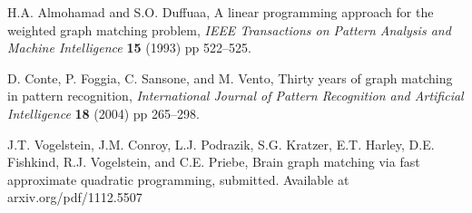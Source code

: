 \documentclass[12pt]{article}
\begin{document}
\begin{thebibliography}{9}

   H.A. Almohamad and S.O. Duffuaa,
   A linear programming approach for the weighted
   graph matching problem,
   \emph{IEEE Transactions on Pattern Analysis and Machine Intelligence}
   {\bf 15} (1993) pp 522--525.

   D. Conte, P. Foggia, C. Sansone, and M. Vento,
   Thirty years of graph matching in pattern recognition,
   \emph{International Journal of Pattern Recognition and
   Artificial Intelligence} {\bf 18} (2004) pp 265--298.

    J.T. Vogelstein, J.M. Conroy, L.J. Podrazik,
    S.G. Kratzer, E.T. Harley, D.E. Fishkind,
    R.J. Vogelstein, and C.E. Priebe,
    Brain graph matching via fast approximate quadratic programming,
    submitted. Available at arxiv.org/pdf/1112.5507



\end{thebibliography}
\end{document}
